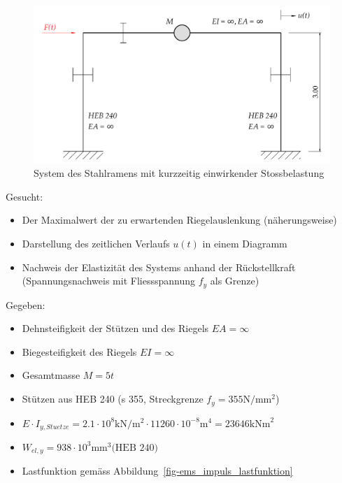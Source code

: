 \documentclass[
  letterpaper,
  DIV=11]{scrreprt}
\providecommand{\tightlist}{%
  \setlength{\itemsep}{0pt}\setlength{\parskip}{0pt}}\usepackage{longtable,booktabs,array}
\begin{document}
\begin{figure}[H]

{\centering \includegraphics{index_files/mediabag/bilder/aufgabe_ems_impuls.pdf}

}

\caption{\label{fig-ems_impuls_system}System des Stahlramens mit
kurzzeitig einwirkender Stossbelastung}

\end{figure}

Gesucht:

\begin{itemize}
\tightlist
\item
  Der Maximalwert der zu erwartenden Riegelauslenkung (näherungsweise)
\item
  Darstellung des zeitlichen Verlaufs \(u(t)\) in einem Diagramm
\item
  Nachweis der Elastizität des Systems anhand der Rückstellkraft
  (Spannungsnachweis mit Fliessspannung \(f_y\) als Grenze)
\end{itemize}

Gegeben:

\begin{itemize}
\tightlist
\item
  Dehnsteifigkeit der Stützen und des Riegels \(EA = \infty\)
\item
  Biegesteifigkeit des Riegels \(EI = \infty\)
\item
  Gesamtmasse \(M = 5 t\)
\item
  Stützen aus HEB 240 (s 355, Streckgrenze
  \(f_y = 355 \text{N}/\text{mm}^2\))
\item
  \(E\cdot I_{y,Stuetze} = 2.1\cdot10^8 \text{kN}/\text{m}^2 \cdot 11260\cdot10^{-8} \text{m}^4 = 23646 \text{kNm}^2\)
\item
  \(W_{el,y} = 938\cdot10^3 \text{mm}^3 \text{(HEB 240)}\)
\item
  Lastfunktion gemäss Abbildung~\ref{fig-ems_impuls_lastfunktion}
\end{itemize}
\end{document}

